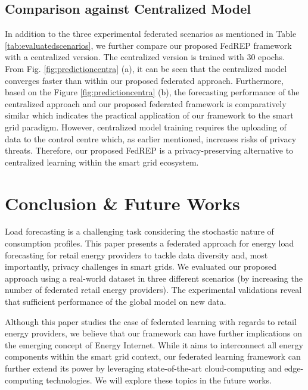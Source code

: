 \documentclass[10pt, conference]{IEEEtran}
\begin{document}
\subsection{Comparison against Centralized Model}
\label{Sec:CompaCentral}

In addition to the three experimental federated scenarios as mentioned in Table \ref{tab:evaluatedscenarios}, we further compare our proposed FedREP framework with a centralized version. The centralized version is trained with 30 epochs. From Fig. \ref{fig:predictioncentra} (a), it can be seen that the centralized model converges faster than within our proposed federated approach. Furthermore, based on the Figure \ref{fig:predictioncentra} (b), the forecasting performance of the centralized approach and our proposed federated framework is comparatively similar which indicates the practical application of our framework to the smart grid paradigm. However, centralized model training requires the uploading of data to the control centre which, as earlier mentioned, increases risks of privacy threats. Therefore, our proposed FedREP is a privacy-preserving alternative to centralized learning within the smart grid ecosystem.

\section{Conclusion \& Future Works}
\label{sec:conclusion}
Load forecasting is a challenging task considering the stochastic nature of consumption profiles. This paper presents a federated approach for energy load forecasting for retail energy providers to tackle data diversity and, most importantly, privacy challenges in smart grids. We evaluated our proposed approach using a real-world dataset in three different scenarios (by increasing the number of federated retail energy providers). The experimental validations reveal that sufficient performance of the global model on new data. 

Although this paper studies the case of federated learning with regards to retail energy providers, we believe that our framework can have further implications on the emerging concept of Energy Internet. While it aims to interconnect all energy components within the smart grid context, our federated learning framework can further extend its power by leveraging state-of-the-art cloud-computing and edge-computing technologies. We will explore these topics in the future works.




\end{document}
